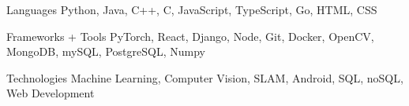 \documentclass[12pt, letterpaper]{awesome-cv}
\begin{document}
\begin{cvskills}
  \cvskill
    {Languages} %
    {Python, Java, C++, C, JavaScript, TypeScript, Go, HTML, CSS} %

  \cvskill
    {Frameworks + Tools} %
    {PyTorch, React, Django, Node, Git, Docker, OpenCV, MongoDB, mySQL, PostgreSQL, Numpy} %
  
  \cvskill
    {Technologies} %
    {Machine Learning, Computer Vision, SLAM, Android, SQL, noSQL, Web Development} %
    
\end{cvskills}

\end{document}
